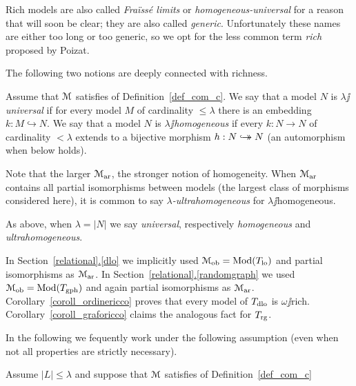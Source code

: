 \documentclass[creche.tex]{subfiles}
\begin{document}
Rich models are also called \textit{Fra\"iss\'e limits} or \textit{homogeneous-universal\/} for a reason that will soon be clear; they are also called \textit{generic}. Unfortunately these names are either too long or too generic, so we opt for the less common term \textit{rich\/} proposed by Poizat. 

The following two notions are deeply connected with richness.





\begin{definition}\label{def_omogenea_universale}
Assume that $\EuScript M$ satisfies  of Definition~\ref{def_com_c}. We say that a model $N$ is \emph{$\lambda\jj$universal\/} if for every model $M$ of cardinality $\le\lambda$ there is an embedding $k:M\hookrightarrow N$. We say that a model $N$ is \emph{$\lambda\jj$homogeneous\/} if every $k:N\to N$ of cardinality $<\lambda$ extends to a bijective morphism $h:N\hookrightarrow\mathrel{\mspace{-15mu}}\rightarrow N$ (an automorphism when  below holds).

Note that the larger $\EuScript M_{\rm ar}$, the stronger notion of homogeneity. When  $\EuScript M_{\rm ar}$ contains all partial isomorphisms between models (the largest class of morphisms considered here), it is common to say \emph{$\lambda$-ultra\-homo\-geneous\/} for $\lambda\jj$homogeneous. 

As above, when $\lambda=|N|$ we say \emph{universal}, respectively \emph{homogeneous} and \emph{ultrahomogeneous}.\QED
\end{definition}


In Section~\hyperref[dlo]{\ref*{relational}.\ref*{dlo}} we implicitly used $\EuScript M_{\rm ob}=\mathop{\rm Mod}(T_{\rm lo})$ and partial isomorphisms as $\EuScript M_{\rm ar}$. In Section~\hyperref[randomgraph]{\ref*{relational}.\ref*{randomgraph}} we used $\EuScript M_{\rm ob}=\mathop{\rm Mod}(T_{\rm gph})$ and again partial isomorphisms as $\EuScript M_{\rm ar}$. Corollary~\ref{coroll_ordinericco} proves that every model of $T_{\rm dlo}$ is $\omega\jj$rich.  Corollary~\ref{coroll_graforicco} claims the analogous fact for $T_{\rm rg}$.


In the following we fequently work under the following assumption (even when not all properties are strictly necessary).
 
\begin{assumption}\label{ass_c0-5}
Assume  $|L|\le\lambda$ and suppose that $\EuScript M$ satisfies  of Definition~\ref{def_com_c}
\end{assumption} 
 
\end{document}
